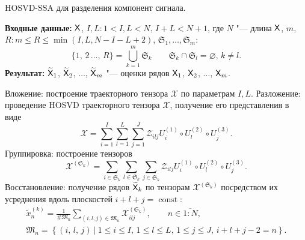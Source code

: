 \documentclass[specialist,
    substylefile = spbu.rtx,
    subf,href,colorlinks=true, 12pt]{disser}
\theoremstyle{plain}
\theoremstyle{definition}
\theoremstyle{remark}
\newcommand{\Input}{\textbf{Входные данные: }}
\newcommand{\Output}{\textbf{Результат: }}
\begin{document}
   \begin{algorithm}[!h]
        \caption{HOSVD-SSA для разделения компонент сигнала.}
        \label{alg:hosvd-ssa-components}
        \Input $\mathsf{X}$, $I,L: 1< I,L < N,\, I + L < N + 1$, где $N$ "--- длина $\mathsf{X}$,
         $m$,\linebreak $R: m \leqslant R\leqslant \min(I, L, N-I-L+2)$,
        $\mathfrak{S}_1, \ldots, \mathfrak{S}_m$:
        \[
            \{1,\, 2\,\ldots,\, R\}=\bigcup_{k=1}^{m}\mathfrak{S}_k \qquad \mathfrak{S}_k\cap \mathfrak{S}_l =\varnothing,\,
        k\ne l.
        \]
        \Output $\widetilde{\mathsf{X}}_1$, $\widetilde{\mathsf{X}}_2$, $\ldots$, $\widetilde{\mathsf{X}}_m$ "--- оценки рядов
        $\mathsf{X}_1$, $\mathsf{X}_2$, $\ldots$, $\mathsf{X}_m$.
        \begin{algorithmic}[1]
            \State \label{alg:first-step}
            Вложение: построение траекторного тензора $\mathcal{X}$ по параметрам $I, L$.
            \State \label{alg:second-step}
            Разложение: проведение HOSVD траекторного тензора $\mathcal{X}$, получение его представления в виде
            \begin{equation}
                \mathcal{X}=\sum_{i=1}^{I} \sum_{l=1}^{L} \sum_{j=1}^{J} \mathcal{Z}_{ilj} U^{(1)}_{i}
                \circ U^{(2)}_{l} \circ U^{(3)}_{j}.
                \label{eq:trajectory-hosvd}
            \end{equation}
            \State Группировка: построение тензоров
            \begin{equation*}
                \mathcal{X}^{(\mathfrak{S}_k)}=\sum_{i \in \mathfrak{S}_k} \sum_{l\in \mathfrak{S}_k} \sum_{j\in \mathfrak{S}_k}
                \mathcal{Z}_{ilj} U^{(1)}_{i}\circ U^{(2)}_{l} \circ U^{(3)}_{j}.
            \end{equation*}
            \State Восстановление: получение рядов $\widetilde{\mathsf{X}}_k$ по тензорам
            $\mathcal{X}^{(\mathfrak{S}_k)}$ посредством их усреднения вдоль
            плоскостей $i+l+j=\operatorname{const}$:
            \begin{gather*}
                \tilde{x}^{(k)}_n=\frac{1}{\#\mathfrak{M}_n}\sum_{(i,l,j)\in \mathfrak{M}_n} \mathcal{X}^{(\mathfrak{S}_k)}_{ilj},\qquad n\in \overline{1:N},         \\
                \mathfrak{M}_n=\left\{(i,\, l,\, j)~\Big|~1\leqslant i \leqslant I,\, 1\leqslant l \leqslant L,\, 1\leqslant j \leqslant J,\, i+l+j-2=n\right\}.
            \end{gather*}
        \end{algorithmic}
    \end{algorithm}
\end{document}
